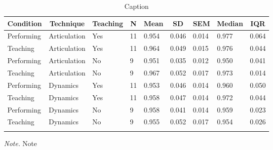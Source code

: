 \documentclass[
  man,floatsintext]{apa6}
\begin{document}
\begin{table}[tbp]

\begin{center}
\begin{threeparttable}

\caption{\label{tab:ioi-teaching-desc-2}Caption}

\begin{tabular}{lllllllll}
\toprule
Condition & \multicolumn{1}{c}{Technique} & \multicolumn{1}{c}{Teaching} & \multicolumn{1}{c}{N} & \multicolumn{1}{c}{Mean} & \multicolumn{1}{c}{SD} & \multicolumn{1}{c}{SEM} & \multicolumn{1}{c}{Median} & \multicolumn{1}{c}{IQR}\\
\midrule
Performing & Articulation & Yes & 11 & 0.954 & 0.046 & 0.014 & 0.977 & 0.064\\
Teaching & Articulation & Yes & 11 & 0.964 & 0.049 & 0.015 & 0.976 & 0.044\\
Performing & Articulation & No & 9 & 0.951 & 0.035 & 0.012 & 0.950 & 0.041\\
Teaching & Articulation & No & 9 & 0.967 & 0.052 & 0.017 & 0.973 & 0.014\\
Performing & Dynamics & Yes & 11 & 0.953 & 0.046 & 0.014 & 0.960 & 0.050\\
Teaching & Dynamics & Yes & 11 & 0.958 & 0.047 & 0.014 & 0.972 & 0.044\\
Performing & Dynamics & No & 9 & 0.958 & 0.041 & 0.014 & 0.959 & 0.023\\
Teaching & Dynamics & No & 9 & 0.955 & 0.052 & 0.017 & 0.954 & 0.026\\
\bottomrule
\addlinespace
\end{tabular}

\begin{tablenotes}[para]
\normalsize{\textit{Note.} Note}
\end{tablenotes}

\end{threeparttable}
\end{center}

\end{table}
\end{document}
